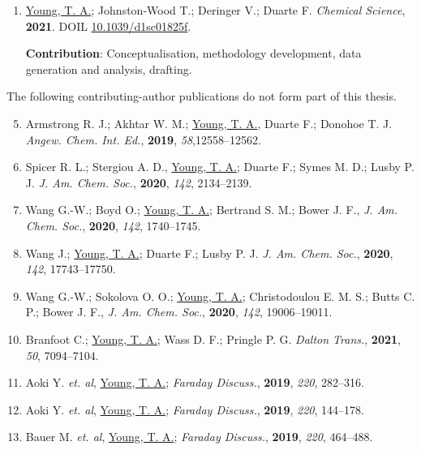 \documentclass[main.tex]{subfiles}
\begin{document}
{\begin{enumerate}[label=\Roman*., itemsep=2ex]
		
		\item \underline{Young, T. A.}; Johnston-Wood T.; Deringer V.;  Duarte F. \emph{Chemical Science}, {\bfseries{2021}}. DOIL \href{https://doi.org/10.1039/d1sc01825f}{10.1039/d1sc01825f}.
		
			\begin{minipage}{0.9\textwidth}
			\singlespacing
			{\small  {\bfseries{Contribution}}: Conceptualisation, methodology development, data generation and analysis, drafting.} 
			\end{minipage}
		
	\end{enumerate}

	\newpage
	The following contributing-author publications do not form part of this thesis.
	\vspace{0.3cm}
	
	\begin{enumerate}[label=\Roman*., itemsep=2ex]
		\setcounter{enumi}{4}
		\item Armstrong R. J.; Akhtar W. M.; \underline{Young, T. A.}, Duarte F.; Donohoe T. J. \emph{Angew. Chem. Int. Ed.}, {\bfseries{2019}}, \emph{58},12558--12562.
		
		\item Spicer R. L.; Stergiou A. D., \underline{Young, T. A.}; Duarte F.; Symes M. D.; Lusby P. J. \emph{J. Am. Chem. Soc.},  {\bfseries{2020}}, \emph{142}, 2134--2139.
		
		\item Wang G.-W.; Boyd O.; \underline{Young, T. A.}; Bertrand S. M.; Bower J. F., \emph{J. Am. Chem. Soc.}, {\bfseries{2020}}, \emph{142}, 1740--1745.
		
		\item Wang J.; \underline{Young, T. A.}; Duarte F.; Lusby P. J. \emph{J. Am. Chem. Soc.}, {\bfseries{2020}}, \emph{142}, 17743--17750.
		
		\item Wang G.-W.; Sokolova O. O.; \underline{Young, T. A.}; Christodoulou E. M. S.;  Butts C. P.; Bower J. F., \emph{J. Am. Chem. Soc.}, {\bfseries{2020}}, \emph{142}, 19006--19011.
		
		\item Branfoot C.; \underline{Young, T. A.}; Wass D. F.; Pringle P. G. \emph{Dalton Trans.}, {\bfseries{2021}}, \emph{50}, 7094--7104.
		
		\item Aoki Y. \emph{et. al}, \underline{Young, T. A.}; \emph{Faraday Discuss.}, {\bfseries{2019}}, \emph{220}, 282--316.
		
		
		\item Aoki Y. \emph{et. al}, \underline{Young, T. A.}; \emph{Faraday Discuss.}, {\bfseries{2019}}, \emph{220}, 144--178.
		
		\item Bauer M. \emph{et. al}, \underline{Young, T. A.}; \emph{Faraday Discuss.}, {\bfseries{2019}}, \emph{220}, 464--488.
	\end{enumerate}
	\newpage
    }
		
\end{document}
